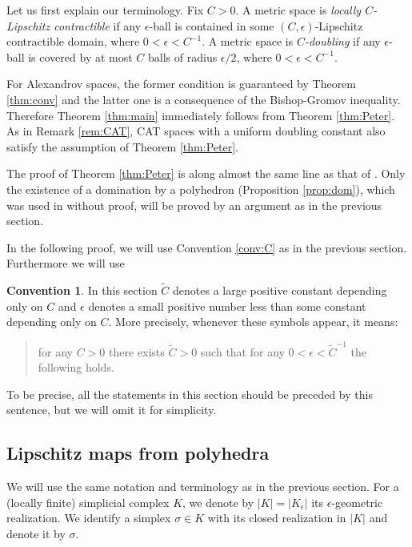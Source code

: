 \documentclass[a4paper,12pt]{amsart}
\theoremstyle{plain}
\theoremstyle{definition}
\newtheorem{conv}[thm]{Convention}
\numberwithin{thm}{section}
\numberwithin{equation}{section}
\begin{document}
Let us first explain our terminology.
Fix $C>0$.
A metric space is \textit{locally $C$-Lipschitz contractible} if any $\epsilon$-ball is contained in some $(C,\epsilon)$-Lipschitz contractible domain, where $0<\epsilon<C^{-1}$.
A metric space is \textit{$C$-doubling} if any $\epsilon$-ball is covered by at most $C$ balls of radius $\epsilon/2$, where $0<\epsilon<C^{-1}$.

For Alexandrov spaces, the former condition is guaranteed by Theorem \ref{thm:conv} and the latter one is a consequence of the Bishop-Gromov inequality.
Therefore Theorem \ref{thm:main} immediately follows from Theorem \ref{thm:Peter}.
As in Remark \ref{rem:CAT}, CAT spaces with a uniform doubling constant also satisfy the assumption of Theorem \ref{thm:Peter}.

The proof of Theorem \ref{thm:Peter} is along almost the same line as that of \cite[Theorem A]{Peter}.
Only the existence of a domination by a polyhedron (Proposition \ref{prop:dom}), which was used in \cite{Peter} without proof, will be proved by an argument as in the previous section.

In the following proof, we will use Convention \ref{conv:C} as in the previous section.
Furthermore we will use

\begin{conv}\label{conv:C'}
In this section $\tilde C$ denotes a large positive constant depending only on $C$ and $\epsilon$ denotes a small positive number less than some constant depending only on $C$.
More precisely, whenever these symbols appear, it means:
\begin{quote}
for any $C>0$ there exists $\tilde C>0$ such that for any $0<\epsilon<\tilde C^{-1}$ the following holds.
\end{quote}
To be precise, all the statements in this section should be preceded by this sentence, but we will omit it for simplicity.
\end{conv}

\subsection{Lipschitz maps from polyhedra}

We will use the same notation and terminology as in the previous section.
For a (locally finite) simplicial complex $K$, we denote by $|K|=|K_\epsilon|$ its $\epsilon$-geometric realization.
We identify a simplex $\sigma\in K$ with its closed realization in $|K|$ and denote it by $\sigma$.
\end{document}
